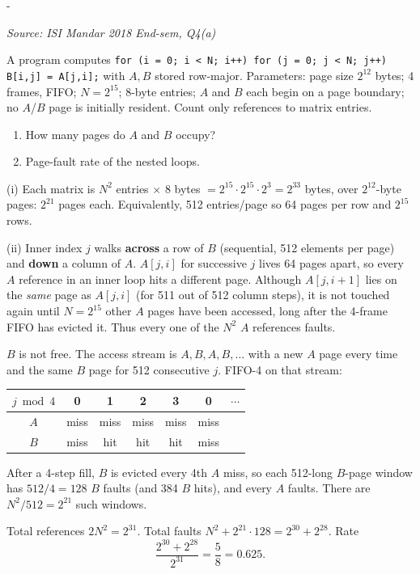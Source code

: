 \documentclass[11pt,a4paper]{article}
\makeatletter
\newcommand{\keepspace}[1]{\par\penalty-100\begingroup
  \setlength{\dimen@}{#1}\dimen@ii\pagegoal\advance\dimen@ii-\pagetotal
  \ifdim\dimen@>\dimen@ii\ifdim\dimen@ii>\z@\vfil\fi\break\fi\endgroup}
\newcounter{qn}[section]
\newenvironment{Qn}[4]{%
  \refstepcounter{qn}\keepspace{7\baselineskip}%
  \begin{tcolorbox}[qboxstyle, title={Q\thesection.\theqn\ \ [#1 \textbar\ #2]\ \ #4}]%
  {\footnotesize\color{g3}\textit{Source: #3}}\par\smallskip%
}{%
  \end{tcolorbox}%
}
\newenvironment{Sol}{%
  \begin{tcolorbox}[sboxstyle, title={Solution}]%
}{%
  \end{tcolorbox}\vspace{0.35em}%
}
\makeatother
\begin{document}
\begin{Qn}{Hard}{Lect 15}{ISI Mandar 2018 End-sem, Q4(a)}{FIFO page-fault rate of an $N\times N$ transpose}
A program computes \texttt{for (i = 0; i < N; i++) for (j = 0; j < N; j++) B[i,j] = A[j,i];} with $A,B$ stored row-major.
Parameters: page size $2^{12}$ bytes; 4 frames, FIFO; $N=2^{15}$; 8-byte
entries; $A$ and $B$ each begin on a page boundary; no $A$/$B$ page is
initially resident. Count only references to matrix entries.
\begin{enumerate}
  \item[(i)] How many pages do $A$ and $B$ occupy?
  \item[(ii)] Page-fault rate of the nested loops.
\end{enumerate}
\end{Qn}
\begin{Sol}
(i) Each matrix is $N^{2}$ entries $\times$ 8 bytes
$= 2^{15}\cdot 2^{15}\cdot 2^{3} = 2^{33}$ bytes, over $2^{12}$-byte
pages: $2^{21}$ pages each. Equivalently, 512 entries/page so 64 pages
per row and $2^{15}$ rows.

(ii) Inner index $j$ walks \textbf{across} a row of $B$ (sequential,
512 elements per page) and \textbf{down} a column of $A$.
$A[j,i]$ for successive $j$ lives 64 pages apart, so every $A$
reference in an inner loop hits a different page. Although $A[j,i+1]$
lies on the \emph{same} page as $A[j,i]$ (for 511 out of 512 column
steps), it is not touched again until $N = 2^{15}$ other $A$ pages have
been accessed, long after the 4-frame FIFO has evicted it. Thus every
one of the $N^{2}$ $A$ references faults.

$B$ is not free. The access stream is $A,B,A,B,\ldots$ with a new $A$
page every time and the same $B$ page for 512 consecutive $j$. FIFO-4
on that stream:
\begin{center}
\small
\begin{tabular}{c|cccccc}
$j \bmod 4$ & 0 & 1 & 2 & 3 & 0 & $\cdots$ \\
\hline
$A$ & miss & miss & miss & miss & miss & \\
$B$ & miss & hit  & hit  & hit  & miss & \\
\end{tabular}
\end{center}
After a 4-step fill, $B$ is evicted every 4th $A$ miss, so each 512-long
$B$-page window has $512/4=128$ $B$ faults (and 384 $B$ hits), and every
$A$ faults. There are $N^{2}/512 = 2^{21}$ such windows.

Total references $2N^{2}=2^{31}$. Total faults
$N^{2} + 2^{21}\cdot 128 = 2^{30}+2^{28}$. Rate
\[
  \frac{2^{30}+2^{28}}{2^{31}} = \frac{5}{8} = 0.625.
\]
\end{Sol}
\end{document}
